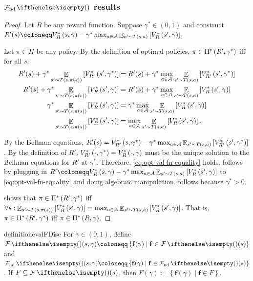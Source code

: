 \documentclass{article}
\newcommand*{\prn}[1]{\left(#1\right)}
\newcommand*{\brx}[1]{\left[#1\right]}
\renewcommand{\set}[1]{\left\{#1\right\}}
\newcommand*{\defeq}{\coloneqq} %
\newcommand*{\A}{\mathcal{A}}
\newcommand*{\optPi}{\piSet[*]}
\DeclareMathOperator*{\opE}{\mathbb{E}}
\newcommand*{\E}[2]{\opE_{#1}\brx{#2}} %
\newcommand*{\f}{\mathbf{f}} %
\theoremstyle{definition}
\begin{document}
\begin{appendices}
\subsubsection{\texorpdfstring{$\Fnd$}{Non-dominated visit distribution} results} 
  
\transferDiscount
\begin{proof}
Let $R$ be any reward function. Suppose $\gamma^*\in(0,1)$ and construct $R'(s)\defeq \OptVf{s, \gamma}- \gamma^* \max_{a\in\A}\E{s'\sim T(s,a)}{\OptVf{s',\gamma}}$. 

Let $\pi\in\Pi$ be any policy. By the definition of optimal policies, $\pi\in\optPi[R',\gamma^*]$ iff for all $s$:
\begin{align}
    R'(s) + \gamma^* \E{s' \sim T\prn{s,\pi(s)}}{\OptVf[R']{s',\gamma^*}}&=R'(s) + \gamma^* \max_{a\in\A}\E{s' \sim T\prn{s,a}}{\OptVf[R']{s',\gamma^*}}\\
    R'(s) + \gamma^* \E{s' \sim T\prn{s,\pi(s)}}{\OptVf{s',\gamma}}&=R'(s) + \gamma^* \max_{a\in\A}\E{s' \sim T\prn{s,a}}{\OptVf{s',\gamma}}\label{eq:opt-val-fn-equality}\\
    \gamma^*\E{s' \sim T\prn{s,\pi(s)}}{\OptVf{s',\gamma}}&=\gamma^*\max_{a\in\A}\E{s'\sim T(s,a)}{\OptVf{s',\gamma}}\label{eq:subst-r'}\\
    \E{s' \sim T\prn{s,\pi(s)}}{\OptVf{s',\gamma}}&=\max_{a\in\A}\E{s'\sim T(s,a)}{\OptVf{s',\gamma}}.\label{eq:div-gamma*}
\end{align} 

By the Bellman equations, $R'(s)=\OptVf[R']{s, \gamma^*}- \gamma^* \max_{a\in\A}\E{s'\sim T(s,a)}{\OptVf[R']{s',\gamma^*}}$. By the definition of $R'$, $\OptVf[R']{\cdot,\gamma^*}=\OptVf[R]{\cdot, \gamma}$ must be the unique solution to the Bellman equations for $R'$ at $\gamma^*$. Therefore, \cref{eq:opt-val-fn-equality} holds.  follows by plugging in $R'\defeq \OptVf{s, \gamma}- \gamma^* \max_{a\in\A}\E{s'\sim T(s,a)}{\OptVf{s',\gamma}}$ to \cref{eq:opt-val-fn-equality} and doing algebraic manipulation.  follows because $\gamma^*>0$.  

 shows that $\pi\in\optPi[R',\gamma^*]$ iff $\forall s: \E{s'\sim T(s,\pi(s))}{\OptVf{s',\gamma}} = \max_{a\in\A} \E{s'\sim T(s,a)}{\OptVf{s',\gamma}}$. That is, $\pi\in\optPi[R',\gamma^*]$ iff $\pi\in\optPi[R,\gamma]$.
\end{proof} 

\begin{restatable}{definition}{evalFDisc}\label{def:eval-f-discount}
For $\gamma \in (0,1)$, define $\F(s,\gamma)\defeq \set{\f(\gamma) \mid \f \in \F(s)}$ and $\Fnd(s,\gamma)\defeq \set{\f(\gamma) \mid \f \in \Fnd(s)}$. If $F\subseteq \F(s)$, then $F(\gamma) \defeq \set{\f(\gamma) \mid \f \in F}$.
\end{restatable}


\end{appendices}
\end{document}
